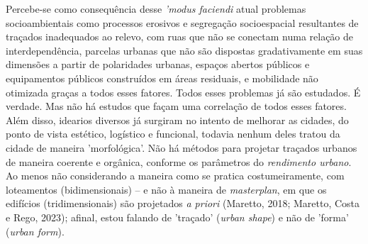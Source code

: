 \documentclass[]{report}
\begin{document}
    Percebe-se como consequência desse \textit{'modus faciendi} atual problemas socioambientais como processos erosivos e segregação socioespacial resultantes de traçados inadequados ao relevo, com ruas que não se conectam numa relação de interdependência, parcelas urbanas que não são dispostas gradativamente em suas dimensões a partir de polaridades urbanas, espaços abertos públicos e equipamentos públicos construídos em áreas residuais, e mobilidade não otimizada graças a todos esses fatores. Todos esses problemas já são estudados. É verdade. Mas não há estudos que façam uma correlação de todos esses fatores. Além disso, idearios diversos já surgiram no intento de melhorar as cidades, do ponto de vista estético, logístico e funcional, todavia nenhum deles tratou da cidade de maneira 'morfológica'. Não há métodos para projetar traçados urbanos de maneira coerente e orgânica, conforme os parâmetros do \textit{rendimento urbano}. Ao menos não considerando a maneira como se pratica costumeiramente, com loteamentos (bidimensionais) – e não à maneira de \textit{masterplan}, em que os edifícios (tridimensionais) são projetados \textit{a priori} (Maretto, 2018; Maretto, Costa e Rego, 2023); afinal, estou falando de 'traçado' (\textit{urban shape}) e não de 'forma' (\textit{urban form}). %
\end{document}
